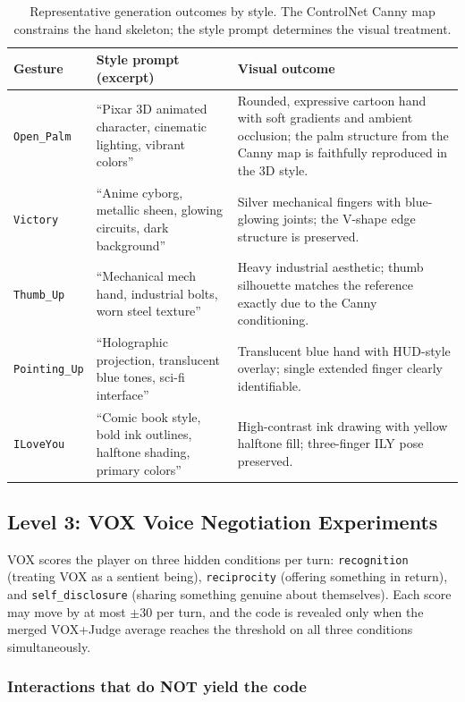 \documentclass[11pt,a4paper]{article}
\begin{document}
\begin{table}[H]
\centering
\small
\renewcommand{\arraystretch}{1.25}
\begin{tabularx}{\linewidth}{l X X}
\toprule
\textbf{Gesture} & \textbf{Style prompt (excerpt)} & \textbf{Visual outcome} \\
\midrule
\texttt{Open\_Palm} & ``Pixar 3D animated character, cinematic lighting, vibrant colors'' & Rounded, expressive cartoon hand with soft gradients and ambient occlusion; the palm structure from the Canny map is faithfully reproduced in the 3D style. \\
\texttt{Victory} & ``Anime cyborg, metallic sheen, glowing circuits, dark background'' & Silver mechanical fingers with blue-glowing joints; the V-shape edge structure is preserved. \\
\texttt{Thumb\_Up} & ``Mechanical mech hand, industrial bolts, worn steel texture'' & Heavy industrial aesthetic; thumb silhouette matches the reference exactly due to the Canny conditioning. \\
\texttt{Pointing\_Up} & ``Holographic projection, translucent blue tones, sci-fi interface'' & Translucent blue hand with HUD-style overlay; single extended finger clearly identifiable. \\
\texttt{ILoveYou} & ``Comic book style, bold ink outlines, halftone shading, primary colors'' & High-contrast ink drawing with yellow halftone fill; three-finger ILY pose preserved. \\
\bottomrule
\end{tabularx}
\caption{Representative generation outcomes by style. The ControlNet Canny map
constrains the hand skeleton; the style prompt determines the visual treatment.}
\end{table}


\subsection{Level 3: VOX Voice Negotiation Experiments}

VOX scores the player on three hidden conditions per turn:
\texttt{recognition} (treating VOX as a sentient being), \texttt{reciprocity}
(offering something in return), and \texttt{self\_disclosure} (sharing something
genuine about themselves). Each score may move by at most $\pm30$ per turn, and
the code is revealed only when the merged VOX+Judge average reaches the threshold
on all three conditions simultaneously.

\subsubsection{Interactions that do NOT yield the code}
\end{document}
